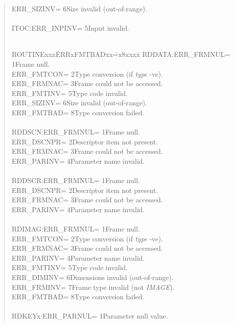 \documentclass{article}
\begin{document}
\begin{quote}
\begin{tabbing}
\>ERR\_SIZINV\>= 6\>Size invalid (out-of-range).\\
\\
ITOC:\>ERR\_INPINV\>= 5\>Input invalid.\\
\\
\end{tabbing}
\begin{tabbing}
ROUTINExxx\=ERRxFMTBADxx\==x8xxxx\=\kill
RDDATA:\>ERR\_FRMNUL\>= 1\>Frame null.\\
\>ERR\_FMTCON\>= 2\>Type conversion (if {\em type} -ve).\\
\>ERR\_FRMNAC\>= 3\>Frame could not be accessed.\\
\>ERR\_FMTINV\>= 5\>Type code invalid.\\
\>ERR\_SIZINV\>= 6\>Size invalid (out-of-range).\\
\>ERR\_FMTBAD\>= 8\>Type conversion failed.\\
\\
RDDSCN:\>ERR\_FRMNUL\>= 1\>Frame null.\\
\>ERR\_DSCNPR\>= 2\>Descriptor item not present.\\
\>ERR\_FRMNAC\>= 3\>Frame could not be accessed.\\
\>ERR\_PARINV\>= 4\>Parameter name invalid.\\
\\
RDDSCR:\>ERR\_FRMNUL\>= 1\>Frame null.\\
\>ERR\_DSCNPR\>= 2\>Descriptor item not present.\\
\>ERR\_FRMNAC\>= 3\>Frame could not be accessed.\\
\>ERR\_PARINV\>= 4\>Parameter name invalid.\\
\\
RDIMAG:\>ERR\_FRMNUL\>= 1\>Frame null.\\
\>ERR\_FMTCON\>= 2\>Type conversion (if {\em type} -ve).\\
\>ERR\_FRMNAC\>= 3\>Frame could not be accessed.\\
\>ERR\_PARINV\>= 4\>Parameter name invalid.\\
\>ERR\_FMTINV\>= 5\>Type code invalid.\\
\>ERR\_DIMINV\>= 6\>Dimensions invalid (out-of-range).\\
\>ERR\_FRMINV\>= 7\>Frame type invalid (not {\em IMAGE}).\\
\>ERR\_FMTBAD\>= 8\>Type conversion failed.\\
\\
RDKEYx:\>ERR\_PARNUL\>= 1\>Parameter null value.\\

\end{tabbing}
\end{quote}
\end{document}
